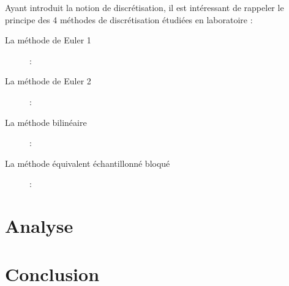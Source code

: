 \newpage
Ayant introduit la notion de discrétisation, il est intéressant de rappeler le principe des 4 méthodes de discrétisation étudiées en laboratoire : 
\begin{description}
\item[La méthode de Euler 1] :  
\item[La méthode de Euler 2] : 
\item[La méthode bilinéaire] :  
\item[La méthode équivalent échantillonné bloqué] :  
\end{description}

\section{Analyse}


\section{Conclusion}

